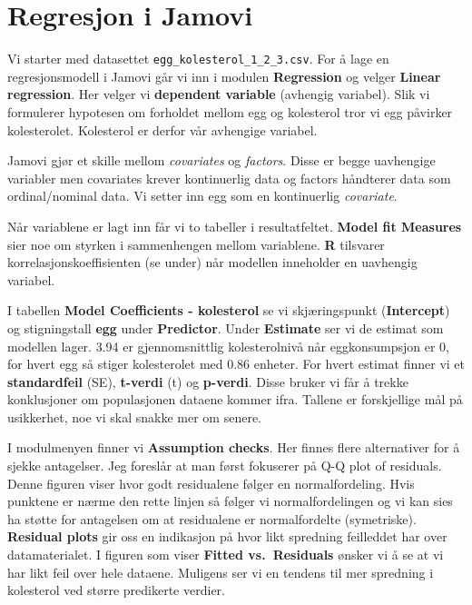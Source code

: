 \documentclass[
  letterpaper,
  DIV=11,
  numbers=noendperiod,
  oneside]{scrreprt}
\begin{document}
\hypertarget{regresjon-i-jamovi}{%
\section{Regresjon i Jamovi}\label{regresjon-i-jamovi}}

Vi starter med datasettet \texttt{egg\_kolesterol\_1\_2\_3.csv}. For å
lage en regresjonsmodell i Jamovi går vi inn i modulen
\textbf{Regression} og velger \textbf{Linear regression}. Her velger vi
\textbf{dependent variable} (avhengig variabel). Slik vi formulerer
hypotesen om forholdet mellom egg og kolesterol tror vi egg påvirker
kolesterolet. Kolesterol er derfor vår avhengige variabel.

Jamovi gjør et skille mellom \emph{covariates} og \emph{factors}. Disse
er begge uavhengige variabler men covariates krever kontinuerlig data og
factors håndterer data som ordinal/nominal data. Vi setter inn egg som
en kontinuerlig \emph{covariate}.

Når variablene er lagt inn får vi to tabeller i resultatfeltet.
\textbf{Model fit Measures} sier noe om styrken i sammenhengen mellom
variablene. \textbf{R} tilsvarer korrelasjonskoeffisienten (se under)
når modellen inneholder en uavhengig variabel.

I tabellen \textbf{Model Coefficients - kolesterol} se vi skjæringspunkt
(\textbf{Intercept}) og stigningstall \textbf{egg} under
\textbf{Predictor}. Under \textbf{Estimate} ser vi de estimat som
modellen lager. 3.94 er gjennomsnittlig kolesterolnivå når
eggkonsumpsjon er 0, for hvert egg så stiger kolesterolet med 0.86
enheter. For hvert estimat finner vi et \textbf{standardfeil} (SE),
\textbf{t-verdi} (t) og \textbf{p-verdi}. Disse bruker vi får å trekke
konklusjoner om populasjonen dataene kommer ifra. Tallene er
forskjellige mål på usikkerhet, noe vi skal snakke mer om senere.

I modulmenyen finner vi \textbf{Assumption checks}. Her finnes flere
alternativer for å sjekke antagelser. Jeg foreslår at man først
fokuserer på Q-Q plot of residuals. Denne figuren viser hvor godt
residualene følger en normalfordeling. Hvis punktene er nærme den rette
linjen så følger vi normalfordelingen og vi kan sies ha støtte for
antagelsen om at residualene er normalfordelte (symetriske).
\textbf{Residual plots} gir oss en indikasjon på hvor likt spredning
feilleddet har over datamaterialet. I figuren som viser \textbf{Fitted
vs.~Residuals} ønsker vi å se at vi har likt feil over hele dataene.
Muligens ser vi en tendens til mer spredning i kolesterol ved større
predikerte verdier.
\end{document}
